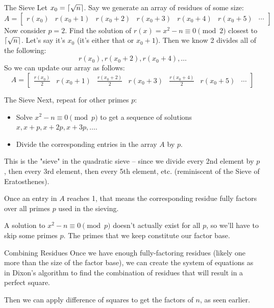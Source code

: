 \documentclass[aspectratio=169]{beamer}
\begin{document}
\begin{frame}{The Sieve}
  Let $x_0 = \left\lceil \sqrt{n} \right\rceil$. Say we generate an array of residues of some size:
  \[A = 
  \begin{bmatrix}
    r(x_0) & r(x_0+1) & r(x_0+2) & r(x_0+3) & r(x_0+4) & r(x_0+5) & \cdots
  \end{bmatrix}
  \] \pause
  Now consider $p = 2$.
  Find the solution of $r(x) = x^2 - n \equiv 0 \pmod{2}$ closest to $\left\lceil \sqrt{n} \right\rceil$.
  Let's say it's $x_0$ (it's either that or $x_0 + 1$).
  Then we know 2 divides all of the following:
  \[r(x_0), r(x_0+2), r(x_0+4), \dots\] \pause
  So we can update our array as follows:
  \[A = 
  \begin{bmatrix}
    \frac{r(x_0)}{2} & r(x_0+1) & \frac{r(x_0+2)}{2} & r(x_0+3) & \frac{r(x_0+4)}{2} & r(x_0+5) & \cdots
  \end{bmatrix}
  \]
\end{frame}

\begin{frame}{The Sieve}
  Next, repeat for other primes $p$:
  \begin{itemize}
    \item Solve $x^2 - n \equiv 0 \pmod{p}$ to get a sequence of solutions
    $x, x+p, x+2p, x+3p, \dots$.
    \item Divide the corresponding entries in the array $A$ by $p$.
  \end{itemize} \pause
  This is the "sieve" in the quadratic sieve -- since we divide
  every 2nd element by $p$, then every 3rd element, then every 5th element, etc.
  (reminiscent of the Sieve of Eratosthenes). \pause

  Once an entry in $A$ reaches 1, that means the
  corresponding residue fully factors over all primes $p$ used in the sieving. \pause

  A solution to $x^2 - n \equiv 0 \pmod{p}$ doesn't actually exist for all $p$,
  so we'll have to skip some primes $p$.
  The primes that we keep constitute our factor base.
\end{frame}

\begin{frame}{Combining Residues}
  Once we have enough fully-factoring residues (likely one more than
  the size of the factor base), we can create the system of equations
  as in Dixon's algorithm to find the combination of residues
  that will result in a perfect square. \pause

  Then we can apply difference of squares to get the factors of $n$, as seen earlier.
\end{frame}
\end{document}

